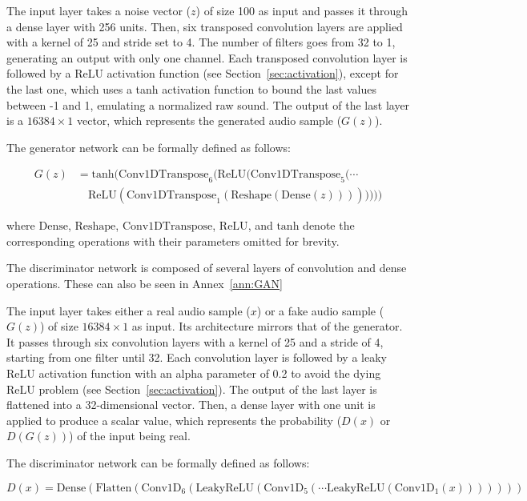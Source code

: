 The input layer takes a noise vector ($z$) of size 100 as input and passes it through a dense layer with 256 units. Then, six transposed convolution layers are applied with a kernel of 25 and stride set to 4. The number of filters goes from 32 to 1, generating an output with only one channel. Each transposed convolution layer is followed by a ReLU activation function (see Section~\ref{sec:activation}), except for the last one, which uses a tanh activation function to bound the last values between -1 and 1, emulating a normalized raw sound. The output of the last layer is a $16384 \times 1$ vector, which represents the generated audio sample ($G(z)$).

The generator network can be formally defined as follows:

\begin{equation}
\begin{split}
G(z) &= \text{tanh}(\text{Conv1DTranspose}_6(\text{ReLU}(\text{Conv1DTranspose}_5 (\cdots \\
&\quad \text{ReLU}(\text{Conv1DTranspose}_1(\text{Reshape}(\text{Dense}(z))))))))
\end{split}
\end{equation}

where $\text{Dense}$, $\text{Reshape}$, $\text{Conv1DTranspose}$, $\text{ReLU}$, and $\text{tanh}$ denote the corresponding operations with their parameters omitted for brevity.

The discriminator network is composed of several layers of convolution and dense operations. These can also be seen in Annex~\ref{ann:GAN}

The input layer takes either a real audio sample ($x$) or a fake audio sample ($G(z)$) of size $16384 \times 1$ as input. Its architecture mirrors that of the generator. It passes through six convolution layers with a kernel of 25 and a stride of 4, starting from one filter until 32. Each convolution layer is followed by a leaky ReLU activation function with an alpha parameter of 0.2 to avoid the dying ReLU problem (see Section~\ref{sec:activation}). The output of the last layer is flattened into a 32-dimensional vector. Then, a dense layer with one unit is applied to produce a scalar value, which represents the probability ($D(x)$ or $D(G(z))$) of the input being real.

The discriminator network can be formally defined as follows:

\begin{equation}
D(x) = \text{Dense}(\text{Flatten}(\text{Conv1D}_6(\text{LeakyReLU}(\text{Conv1D}_5(\cdots \text{LeakyReLU}(\text{Conv1D}_1(x)))))))
\end{equation}

